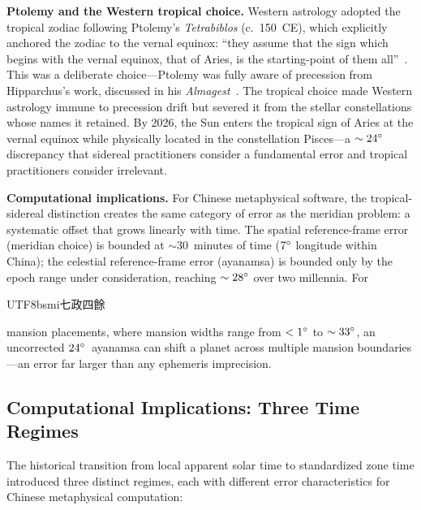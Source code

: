 \documentclass[10pt,a4paper]{article}
\newcommand{\zh}[1]{\begin{CJK}{UTF8}{bsmi}#1\end{CJK}}
\begin{document}
\textbf{Ptolemy and the Western tropical choice.}
Western astrology adopted the tropical zodiac following Ptolemy's
\textit{Tetrabiblos} (c.~150~CE), which explicitly anchored the zodiac
to the vernal equinox: ``they assume that the sign which begins with
the vernal equinox, that of Aries, is the starting-point of them
all''~\cite{ptolemy_tetrabiblos}.  This was a deliberate choice---Ptolemy
was fully aware of precession from Hipparchus's work, discussed in his
\textit{Almagest}~\cite{toomer_almagest}.  The tropical choice made
Western astrology immune to precession drift but severed it from the
stellar constellations whose names it retained.  By 2026, the Sun
enters the tropical sign of Aries at the vernal equinox while
physically located in the constellation
Pisces---a $\sim 24\degree$ discrepancy that sidereal practitioners
consider a fundamental error and tropical practitioners consider
irrelevant.

\textbf{Computational implications.}
For Chinese metaphysical software, the tropical-sidereal distinction
creates the same category of error as the meridian problem: a
systematic offset that grows linearly with time.  The spatial
reference-frame error (meridian choice) is bounded at
$\sim$30~minutes of time ($7\degree$ longitude within China); the
celestial reference-frame error (ayanamsa) is bounded only by the
epoch range under consideration, reaching $\sim 28\degree$ over two
millennia.  For \zh{七政四餘} mansion placements, where mansion widths
range from $<1\degree$ to $\sim 33\degree$, an uncorrected
$24\degree$~ayanamsa can shift a planet across multiple mansion
boundaries---an error far larger than any ephemeris imprecision.

\subsection{Computational Implications: Three Time Regimes}
\label{subsec:timeregimes}

The historical transition from local apparent solar time to standardized
zone time introduced three distinct regimes, each with different error
characteristics for Chinese metaphysical computation:
\end{document}

